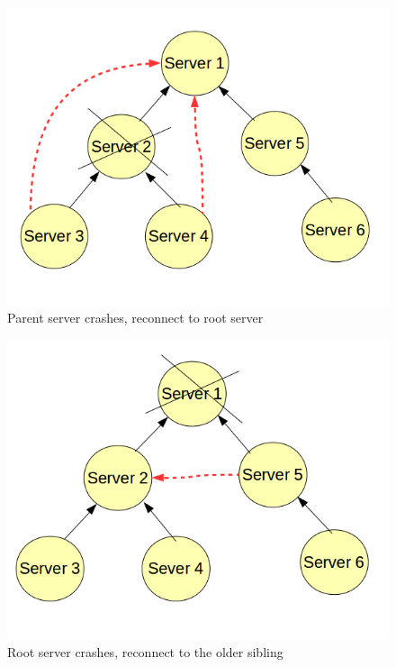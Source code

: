 \documentclass[10pt,twocolumn]{article}
\begin{document}
\begin{figure}[h!]
\begin{center}
\includegraphics[scale=0.4]{parent_crash}
\caption{Parent server crashes, reconnect to root server}
\label{failroot}	
\end{center}
\end{figure}

\begin{figure}[h!]
\begin{center}
\includegraphics[scale=0.4]{root_crash}
\caption{Root server crashes, reconnect to the older sibling}
\label{failsibling}	
\end{center}
\end{figure}
\end{document}
